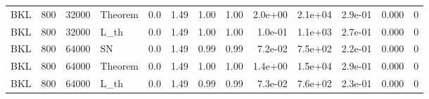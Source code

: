 \begin{tabular}{lrrlrrrrrrrrr}
BKL & 800 & 32000 & Theorem & 0.0 & 1.49 & 1.00 & 1.00 & 2.0e+00 & 2.1e+04 & 2.9e-01 & 0.000 & 0 \\
BKL & 800 & 32000 & L\_th & 0.0 & 1.49 & 1.00 & 1.00 & 1.0e-01 & 1.1e+03 & 2.7e-01 & 0.000 & 0 \\
BKL & 800 & 64000 & SN & 0.0 & 1.49 & 0.99 & 0.99 & 7.2e-02 & 7.5e+02 & 2.2e-01 & 0.000 & 0 \\
BKL & 800 & 64000 & Theorem & 0.0 & 1.49 & 1.00 & 1.00 & 1.4e+00 & 1.5e+04 & 2.9e-01 & 0.000 & 0 \\
BKL & 800 & 64000 & L\_th & 0.0 & 1.49 & 0.99 & 0.99 & 7.3e-02 & 7.6e+02 & 2.3e-01 & 0.000 & 0 \\
\hline
\end{tabular}
